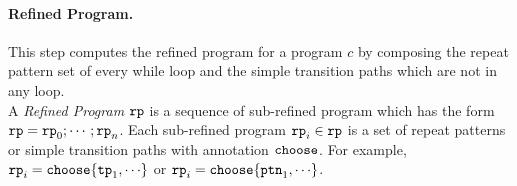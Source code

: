 \paragraph{Refined Program.} This step computes the refined program for a program $c$ by composing the
repeat pattern set of every while loop and the simple transition paths which are not in any loop.
\\
A \emph{Refined Program}
$\mathtt{rp}$ is a sequence of
sub-refined program which
has the form $\mathtt{rp} = \mathtt{rp}_0; \cdots; \mathtt{rp}_n$.
Each sub-refined program
$\mathtt{rp}_i \in \mathtt{rp}$ is
a set of repeat patterns or simple transition paths with annotation $\mathtt{choose}$.
For example, $\rprog_i = \rpchoose{\tpath_1, \cdots}$ or
$\rprog_i = \rpchoose{\rpattern_1, \cdots}$.
